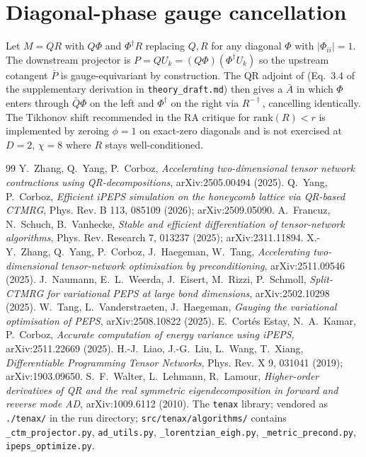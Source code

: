 \documentclass[aps,prresearch,reprint,amsmath,amssymb,floatfix]{revtex4-2}
\newcommand{\tenax}{\texttt{tenax}}
\newcommand{\code}[1]{\texttt{#1}}
\begin{document}
\appendix
\section{Diagonal-phase gauge cancellation}

Let $M=QR$ with $Q\Phi$ and $\Phi^\dagger R$ replacing $Q,R$ for any
diagonal $\Phi$ with $|\Phi_{ii}|=1$. The downstream projector is
$P = Q U_k = (Q\Phi)(\Phi^\dagger U_k)$ so the upstream cotangent
$\bar P$ is gauge-equivariant by construction. The QR adjoint of
\cite{Walter2010} (Eq.~3.4 of the supplementary derivation in
\code{theory\_draft.md}) then gives a $\bar A$ in which $\Phi$ enters
through $\bar Q\Phi$ on the left and $\Phi^\dagger$ on the right via
$R^{-\dagger}$, cancelling identically. The Tikhonov shift recommended
in the RA critique for $\mathrm{rank}(R)<r$ is implemented by zeroing
$\phi=1$ on exact-zero diagonals and is not exercised at $D=2$,
$\chi=8$ where $R$ stays well-conditioned.


\begin{thebibliography}{99}
 Y.~Zhang, Q.~Yang, P.~Corboz, \emph{Accelerating
two-dimensional tensor network contractions using QR-decompositions},
arXiv:2505.00494 (2025).
 Q.~Yang, P.~Corboz, \emph{Efficient iPEPS
simulation on the honeycomb lattice via QR-based CTMRG}, Phys. Rev. B
113, 085109 (2026); arXiv:2509.05090.
 A.~Francuz, N.~Schuch, B.~Vanhecke, \emph{Stable
and efficient differentiation of tensor-network algorithms},
Phys. Rev. Research 7, 013237 (2025); arXiv:2311.11894.
 X.-Y.~Zhang, Q.~Yang, P.~Corboz, J.~Haegeman,
W.~Tang, \emph{Accelerating two-dimensional tensor-network optimisation
by preconditioning}, arXiv:2511.09546 (2025).
 J.~Naumann, E.~L.~Weerda, J.~Eisert, M.~Rizzi,
P.~Schmoll, \emph{Split-CTMRG for variational PEPS at large bond dimensions},
arXiv:2502.10298 (2025).
 W.~Tang, L.~Vanderstraeten, J.~Haegeman,
\emph{Gauging the variational optimisation of PEPS}, arXiv:2508.10822
(2025).
 E.~Cort\'es Estay, N.~A.~Kamar, P.~Corboz,
\emph{Accurate computation of energy variance using iPEPS},
arXiv:2511.22669 (2025).
 H.-J.~Liao, J.-G.~Liu, L.~Wang, T.~Xiang,
\emph{Differentiable Programming Tensor Networks}, Phys. Rev. X 9,
031041 (2019); arXiv:1903.09650.
 S.~F.~Walter, L.~Lehmann, R.~Lamour,
\emph{Higher-order derivatives of QR and the real symmetric
eigendecomposition in forward and reverse mode AD},
arXiv:1009.6112 (2010).
 The \tenax{} library; vendored as
\code{./tenax/} in the run directory; \code{src/tenax/algorithms/}
contains \code{\_ctm\_projector.py}, \code{ad\_utils.py},
\code{\_lorentzian\_eigh.py}, \code{\_metric\_precond.py},
\code{ipeps\_optimize.py}.
\end{thebibliography}
\end{document}
